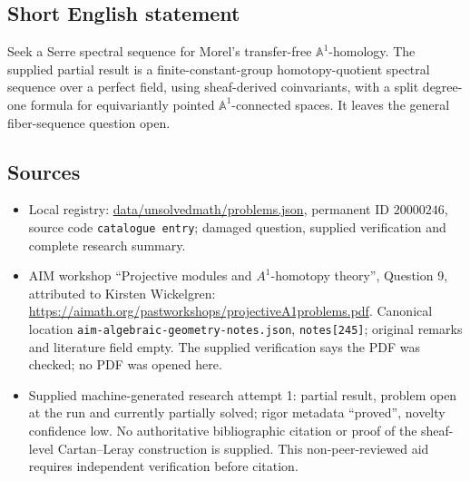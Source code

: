 \documentclass[11pt]{article}
\newcommand{\A}{\mathbb{A}}
\begin{document}
\subsection{Short English statement}
Seek a Serre spectral sequence for Morel's transfer-free $\A^1$-homology. The supplied partial result is a finite-constant-group homotopy-quotient spectral sequence over a perfect field, using sheaf-derived coinvariants, with a split degree-one formula for equivariantly pointed $\A^1$-connected spaces. It leaves the general fiber-sequence question open.
\subsection{Sources}
\begin{itemize}
\item Local registry: \url{data/unsolvedmath/problems.json}, permanent ID $20000246$, source code \texttt{catalogue entry}; damaged question, supplied verification and complete research summary.
\item AIM workshop ``Projective modules and $A^1$-homotopy theory'', Question 9, attributed to Kirsten Wickelgren: \url{https://aimath.org/pastworkshops/projectiveA1problems.pdf}. Canonical location \texttt{aim-algebraic-geometry-notes.json}, \texttt{notes[245]}; original remarks and literature field empty. The supplied verification says the PDF was checked; no PDF was opened here.
\item Supplied machine-generated research attempt 1: partial result, problem open at the run and currently partially solved; rigor metadata ``proved'', novelty confidence low. No authoritative bibliographic citation or proof of the sheaf-level Cartan--Leray construction is supplied. This non-peer-reviewed aid requires independent verification before citation.
\end{itemize}
\end{document}

